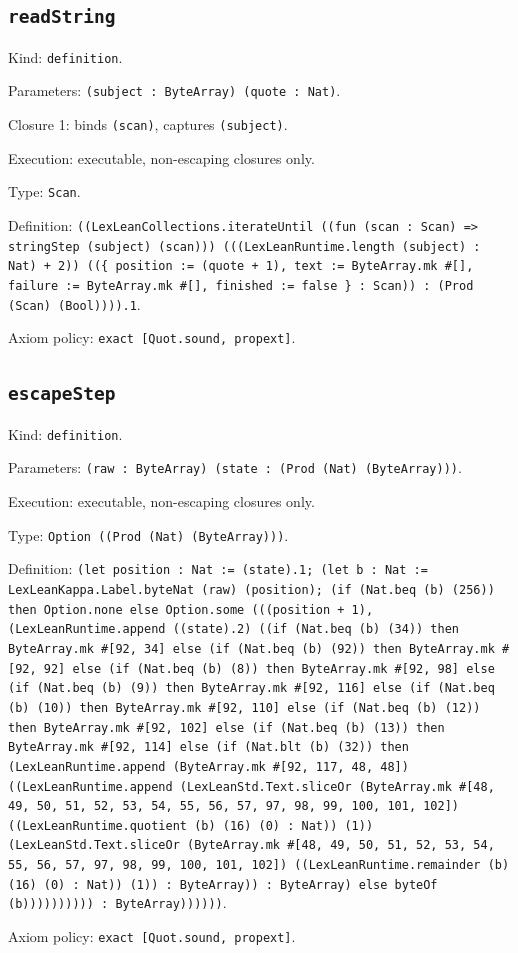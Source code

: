 \documentclass[11pt]{article}
\begin{document}
\subsection*{\texttt{readString}}
\noindent Kind: \texttt{definition}.\par
\noindent Parameters: \texttt{(subject : ByteArray) (quote : Nat)}.\par
\noindent Closure 1: binds \texttt{(scan)}, captures \texttt{(subject)}.\par
\noindent Execution: executable, non-escaping closures only.\par
\noindent Type: \texttt{Scan}.\par
\noindent Definition: \texttt{((LexLeanCollections.iterateUntil ((fun (scan : Scan) => stringStep (subject) (scan))) (((LexLeanRuntime.length (subject) : Nat) + 2)) ((\{ position := (quote + 1), text := ByteArray.mk \#[], failure := ByteArray.mk \#[], finished := false \} : Scan)) : (Prod (Scan) (Bool)))).1}.\par
\noindent Axiom policy: \texttt{exact [Quot.sound, propext]}.\par
\subsection*{\texttt{escapeStep}}
\noindent Kind: \texttt{definition}.\par
\noindent Parameters: \texttt{(raw : ByteArray) (state : (Prod (Nat) (ByteArray)))}.\par
\noindent Execution: executable, non-escaping closures only.\par
\noindent Type: \texttt{Option ((Prod (Nat) (ByteArray)))}.\par
\noindent Definition: \texttt{(let position : Nat := (state).1; (let b : Nat := LexLeanKappa.Label.byteNat (raw) (position); (if (Nat.beq (b) (256)) then Option.none else Option.some (((position + 1), (LexLeanRuntime.append ((state).2) ((if (Nat.beq (b) (34)) then ByteArray.mk \#[92, 34] else (if (Nat.beq (b) (92)) then ByteArray.mk \#[92, 92] else (if (Nat.beq (b) (8)) then ByteArray.mk \#[92, 98] else (if (Nat.beq (b) (9)) then ByteArray.mk \#[92, 116] else (if (Nat.beq (b) (10)) then ByteArray.mk \#[92, 110] else (if (Nat.beq (b) (12)) then ByteArray.mk \#[92, 102] else (if (Nat.beq (b) (13)) then ByteArray.mk \#[92, 114] else (if (Nat.blt (b) (32)) then (LexLeanRuntime.append (ByteArray.mk \#[92, 117, 48, 48]) ((LexLeanRuntime.append (LexLeanStd.Text.sliceOr (ByteArray.mk \#[48, 49, 50, 51, 52, 53, 54, 55, 56, 57, 97, 98, 99, 100, 101, 102]) ((LexLeanRuntime.quotient (b) (16) (0) : Nat)) (1)) (LexLeanStd.Text.sliceOr (ByteArray.mk \#[48, 49, 50, 51, 52, 53, 54, 55, 56, 57, 97, 98, 99, 100, 101, 102]) ((LexLeanRuntime.remainder (b) (16) (0) : Nat)) (1)) : ByteArray)) : ByteArray) else byteOf (b)))))))))) : ByteArray))))))}.\par
\noindent Axiom policy: \texttt{exact [Quot.sound, propext]}.\par
\end{document}
